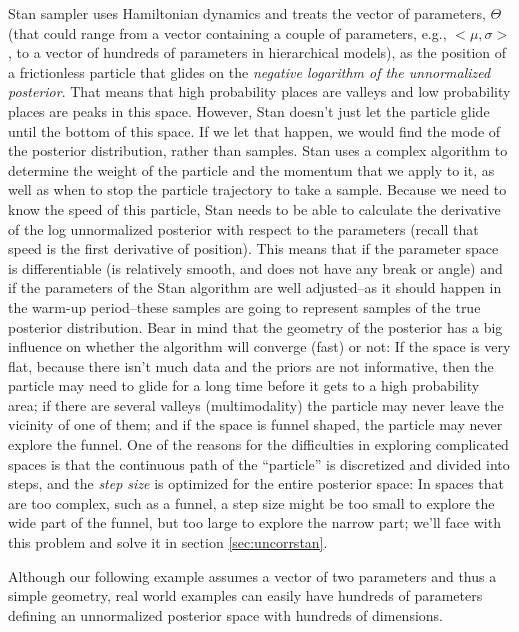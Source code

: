 \documentclass[12pt,]{krantz}
\theoremstyle{definition}
\theoremstyle{definition}
\theoremstyle{definition}
\theoremstyle{remark}
\begin{document}
Stan sampler uses Hamiltonian dynamics and treats the vector of
parameters, \(\Theta\) (that could range from a vector containing a
couple of parameters, e.g., \(<\mu,\sigma>\), to a vector of hundreds of
parameters in hierarchical models), as the position of a frictionless
particle that glides on the \emph{negative logarithm of the unnormalized
posterior}. That means that high probability places are valleys and low
probability places are peaks in this space. However, Stan doesn't just
let the particle glide until the bottom of this space. If we let that
happen, we would find the mode of the posterior distribution, rather
than samples. Stan uses a complex algorithm to determine the weight of
the particle and the momentum that we apply to it, as well as when to
stop the particle trajectory to take a sample. Because we need to know
the speed of this particle, Stan needs to be able to calculate the
derivative of the log unnormalized posterior with respect to the
parameters (recall that speed is the first derivative of position). This
means that if the parameter space is differentiable (is relatively
smooth, and does not have any break or angle) and if the parameters of
the Stan algorithm are well adjusted--as it should happen in the warm-up
period--these samples are going to represent samples of the true
posterior distribution. Bear in mind that the geometry of the posterior
has a big influence on whether the algorithm will converge (fast) or
not: If the space is very flat, because there isn't much data and the
priors are not informative, then the particle may need to glide for a
long time before it gets to a high probability area; if there are
several valleys (multimodality) the particle may never leave the
vicinity of one of them; and if the space is funnel shaped, the particle
may never explore the funnel. One of the reasons for the difficulties in
exploring complicated spaces is that the continuous path of the
``particle'' is discretized and divided into steps, and the \emph{step
size} is optimized for the entire posterior space: In spaces that are
too complex, such as a funnel, a step size might be too small to explore
the wide part of the funnel, but too large to explore the narrow part;
we'll face with this problem and solve it in section
\ref{sec:uncorrstan}.

Although our following example assumes a vector of two parameters and
thus a simple geometry, real world examples can easily have hundreds of
parameters defining an unnormalized posterior space with hundreds of
dimensions.
\end{document}
